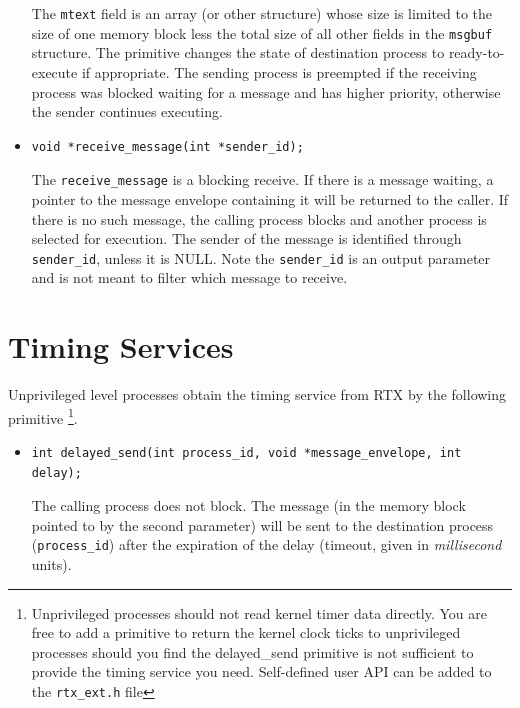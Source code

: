 \begin{itemize}
The \verb+mtext+ field is an array (or other structure) whose size is limited to 
the size of one memory block less 
the total size of all other fields in the \verb+msgbuf+ structure.
The primitive changes the state of destination process to ready-to-execute if appropriate. The sending process is preempted if the receiving process was blocked waiting for a message and has higher priority, otherwise the sender continues executing. \\
    \item[]{}
\begin{lstlisting}
void *receive_message(int *sender_id);
\end{lstlisting}
The \verb+receive_message+ is a blocking receive. If there is a message waiting, a pointer to the message envelope containing it will be returned to the caller. If there is no such message, the calling process blocks and another process is selected for execution. The sender of the message is identified through \verb+sender_id+, unless it is NULL. Note the \verb+sender_id+ is an output parameter and is not meant to filter which message to receive.

\end{itemize}

\section{Timing Services}
\label{sec_timing}

Unprivileged level processes obtain the timing service from RTX by the following primitive
\footnote{Unprivileged processes should not read kernel timer data directly. You are free to add a primitive to
return the kernel clock ticks to unprivileged processes should you find the delayed\_send primitive is not sufficient to provide the timing service you need. Self-defined user API can be added to the \texttt{rtx\_ext.h} file}. \\
\begin{itemize}[]
\item[]{}
\begin{lstlisting}
int delayed_send(int process_id, void *message_envelope, int delay);
\end{lstlisting}
The calling process does not block. The message (in the memory block pointed to by the second parameter) will be sent to the destination process (\verb+process_id+) after the expiration of the delay (timeout, given in {\em millisecond} units). 

\end{itemize}

